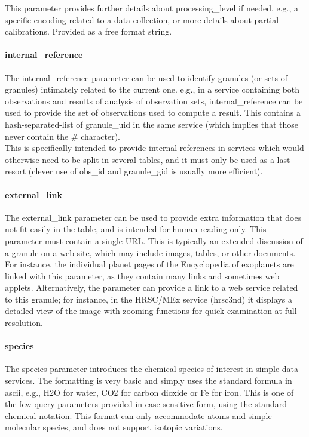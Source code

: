 \documentclass[11pt,a4paper]{ivoa}
\begin{document}
This parameter provides further details about processing\_level if needed, e.g.,
a specific encoding related to a data collection, or more details about partial
calibrations. Provided as a free format string.

\paragraph{internal\_reference}

The internal\_reference parameter can be used to identify granules
(or sets of granules) intimately related to the current one. e.g.,
in a service containing both observations and results of analysis of
observation sets, internal\_reference can be used to provide the set of
observations used to compute a result. This contains a hash-separated-list
of granule\_uid in the same service (which implies that those never
contain the \# character).\\This is specifically intended to provide
internal references in services which would otherwise need to be split
in several tables, and it must only be used as a last resort (clever
use of obs\_id and granule\_gid is usually more efficient).

\paragraph{external\_link}

The external\_link parameter can be used to provide extra information
that does not fit easily in the table, and is intended for human reading
only. This parameter must contain a single URL. This is typically an
extended discussion of a granule on a web site, which may include images,
tables, or other documents. For instance, the individual planet pages of
the Encyclopedia of exoplanets are linked with this parameter, as they
contain many links and sometimes web applets. Alternatively, the parameter
can provide a link to a web service related to this granule; for instance,
in the HRSC/MEx service (hrsc3nd) it displays a detailed view of the
image with zooming functions for quick examination at full resolution.

\paragraph{species}

The species parameter introduces the chemical species of interest in
simple data services. The formatting is very basic and simply uses the
standard formula in ascii, e.g., H2O for water, CO2 for carbon dioxide
or Fe for iron. This is one of the few query parameters provided in
case sensitive form, using the standard chemical notation. This format
can only accommodate atoms and simple molecular species, and does not
support isotopic variations.
\end{document}
